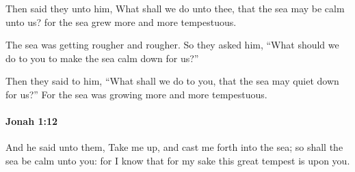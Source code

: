 			\begin{versebox}
					\item[BHS] 
					\item[LXX] 
					\item[ASV] Then said they unto him, What shall we do unto thee, that the sea may be calm unto us? for the sea grew more and more tempestuous.
					\item[NIV] The sea was getting rougher and rougher. So they asked him, “What should we do to you to make the sea calm down for us?”
					\item[NRSV] Then they said to him, “What shall we do to you, that the sea may quiet down for us?” For the sea was growing more and more tempestuous.
			\end{versebox}

		\paragraph{Jonah 1:12} %
			\label{JONAH-1-12}

			And he said unto them, Take me up, and cast me forth into the sea; so shall the sea be calm unto you: for I know that for my sake this great tempest is upon you.

